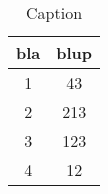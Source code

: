 \begin{table}
 \caption{Caption}
 \label{tab:test}
 \centering
 \begin{tabular}{cc}
 \toprule 
    bla & blup \\
     \midrule
     1 & 43 \\
     2 & 213 \\
     3 & 123 \\
     4 & 12 \\
 \bottomrule
 \end{tabular}
\end{table}